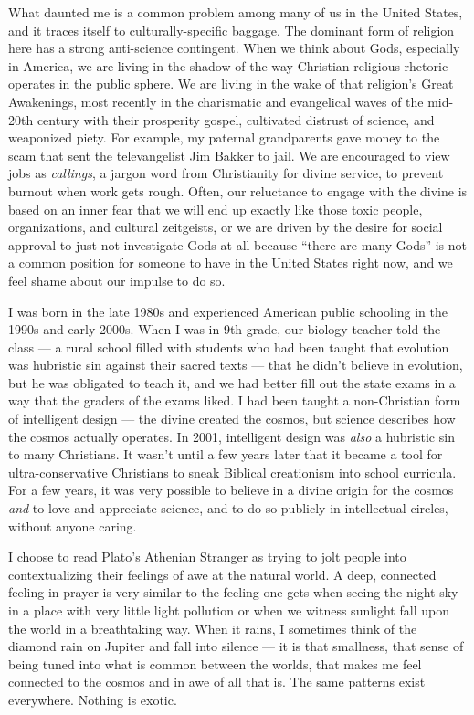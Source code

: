 \documentclass[
]{book}
\begin{document}
What daunted me is a common problem among many of us in the United States, and it traces itself to culturally-specific baggage. The dominant form of religion here has a strong anti-science contingent. When we think about Gods, especially in America, we are living in the shadow of the way Christian religious rhetoric operates in the public sphere. We are living in the wake of that religion's Great Awakenings, most recently in the charismatic and evangelical waves of the mid-20th century with their prosperity gospel, cultivated distrust of science, and weaponized piety. For example, my paternal grandparents gave money to the scam that sent the televangelist Jim Bakker to jail. We are encouraged to view jobs as \emph{callings}, a jargon word from Christianity for divine service, to prevent burnout when work gets rough. Often, our reluctance to engage with the divine is based on an inner fear that we will end up exactly like those toxic people, organizations, and cultural zeitgeists, or we are driven by the desire for social approval to just not investigate Gods at all because ``there are many Gods'' is not a common position for someone to have in the United States right now, and we feel shame about our impulse to do so.

I was born in the late 1980s and experienced American public schooling in the 1990s and early 2000s. When I was in 9th grade, our biology teacher told the class --- a rural school filled with students who had been taught that evolution was hubristic sin against their sacred texts --- that he didn't believe in evolution, but he was obligated to teach it, and we had better fill out the state exams in a way that the graders of the exams liked. I had been taught a non-Christian form of intelligent design --- the divine created the cosmos, but science describes how the cosmos actually operates. In 2001, intelligent design was \emph{also} a hubristic sin to many Christians. It wasn't until a few years later that it became a tool for ultra-conservative Christians to sneak Biblical creationism into school curricula. For a few years, it was very possible to believe in a divine origin for the cosmos \emph{and} to love and appreciate science, and to do so publicly in intellectual circles, without anyone caring.

I choose to read Plato's Athenian Stranger as trying to jolt people into contextualizing their feelings of awe at the natural world. A deep, connected feeling in prayer is very similar to the feeling one gets when seeing the night sky in a place with very little light pollution or when we witness sunlight fall upon the world in a breathtaking way. When it rains, I sometimes think of the diamond rain on Jupiter and fall into silence --- it is that smallness, that sense of being tuned into what is common between the worlds, that makes me feel connected to the cosmos and in awe of all that is. The same patterns exist everywhere. Nothing is exotic.
\end{document}
